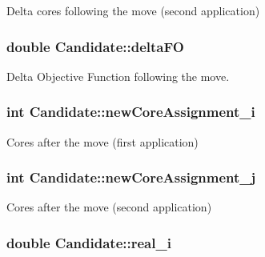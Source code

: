 Delta cores following the move (second application) 

\hypertarget{classCandidate_a1bfc07aae3b3914bba57e057936399e7}{
\subsubsection[{delta\-F\-O}]{\setlength{\rightskip}{0pt plus 5cm}double Candidate\-::delta\-F\-O}}\label{classCandidate_a1bfc07aae3b3914bba57e057936399e7}


Delta Objective Function following the move. 

\hypertarget{classCandidate_a859313416296683b7c0496d842dab48a}{
\subsubsection[{new\-Core\-Assignment\-\_\-i}]{\setlength{\rightskip}{0pt plus 5cm}int Candidate\-::new\-Core\-Assignment\-\_\-i}}\label{classCandidate_a859313416296683b7c0496d842dab48a}


Cores after the move (first application) 

\hypertarget{classCandidate_a1203966358bd849169b5f967de3c2bf7}{
\subsubsection[{new\-Core\-Assignment\-\_\-j}]{\setlength{\rightskip}{0pt plus 5cm}int Candidate\-::new\-Core\-Assignment\-\_\-j}}\label{classCandidate_a1203966358bd849169b5f967de3c2bf7}


Cores after the move (second application) 

\hypertarget{classCandidate_a93a050a3128d98f446176d9411535eea}{
\subsubsection[{real\-\_\-i}]{\setlength{\rightskip}{0pt plus 5cm}double Candidate\-::real\-\_\-i}}\label{classCandidate_a93a050a3128d98f446176d9411535eea}



